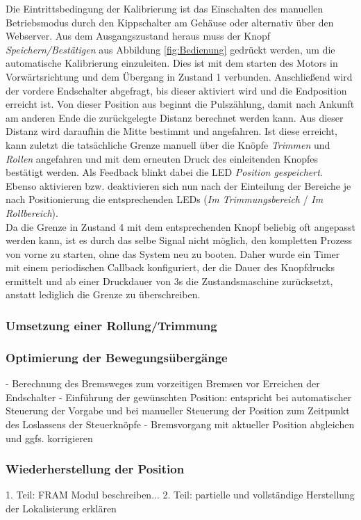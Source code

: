 \noindent
Die Eintrittsbedingung der Kalibrierung ist das Einschalten des manuellen Betriebsmodus durch den Kippschalter am Gehäuse oder alternativ über den Webserver. Aus dem Ausgangszustand heraus muss der Knopf \textit{Speichern/Bestätigen} aus Abbildung \ref{fig:Bedienung} gedrückt werden, um die automatische Kalibrierung einzuleiten. Dies ist mit dem starten des Motors in Vorwärtsrichtung und dem Übergang in Zustand 1 verbunden. Anschließend wird der vordere Endschalter abgefragt, bis dieser aktiviert wird und die Endposition erreicht ist. Von dieser Position aus beginnt die Pulszählung, damit nach Ankunft am anderen Ende die zurückgelegte Distanz berechnet werden kann. Aus dieser Distanz wird daraufhin die Mitte bestimmt und angefahren. Ist diese erreicht, kann zuletzt die tatsächliche Grenze manuell über die Knöpfe \textit{Trimmen} und \textit{Rollen} angefahren und mit dem erneuten Druck des einleitenden Knopfes bestätigt werden. Als Feedback blinkt dabei die LED \textit{Position gespeichert}. Ebenso aktivieren bzw. deaktivieren sich nun nach der Einteilung der Bereiche je nach Positionierung die entsprechenden LEDs (\textit{Im Trimmungsbereich} / \textit{Im Rollbereich}).\\
Da die Grenze in Zustand 4 mit dem entsprechenden Knopf beliebig oft angepasst werden kann, ist es durch das selbe Signal nicht möglich, den kompletten Prozess von vorne zu starten, ohne das System neu zu booten. Daher wurde ein Timer mit einem periodischen Callback konfiguriert, der die Dauer des Knopfdrucks ermittelt und ab einer Druckdauer von 3s die Zustandsmaschine zurücksetzt, anstatt lediglich die Grenze zu überschreiben.
\subsubsection{Umsetzung einer Rollung/Trimmung}
\subsubsection{Optimierung der Bewegungsübergänge}
- Berechnung des Bremsweges zum vorzeitigen Bremsen vor Erreichen der Endschalter
- Einführung der gewünschten Position: entspricht bei automatischer Steuerung der Vorgabe und bei manueller Steuerung der Position zum Zeitpunkt des Loslassens der Steuerknöpfe
 - Bremsvorgang mit aktueller Position abgleichen und ggfs. korrigieren
\subsubsection{Wiederherstellung der Position}
1. Teil: FRAM Modul beschreiben...
2. Teil: partielle und vollständige Herstellung der Lokalisierung erklären
